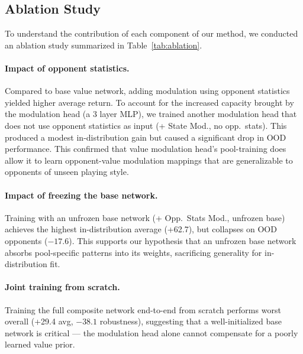 \documentclass{article}
\begin{document}

\subsection{Ablation Study}

To understand the contribution of each component of our method, we conducted an ablation study summarized in Table~\ref{tab:ablation}.

\paragraph{Impact of opponent statistics.}
Compared to base value network, adding modulation using opponent statistics yielded higher average return. To account for the increased capacity brought by the modulation head (a 3 layer MLP), we trained another modulation head that does not use opponent statistics as input (+ State Mod., no opp.\ stats). This produced a modest in-distribution gain but caused a significant drop in OOD performance. This confirmed that value modulation head's pool-training does allow it to learn opponent-value modulation mappings that are generalizable to opponents of unseen playing style.

\paragraph{Impact of freezing the base network.}
Training with an unfrozen base network (+ Opp.\ Stats Mod., unfrozen base) achieves the highest in-distribution average (+62.7), but collapses on OOD opponents ($-17.6$). This supports our hypothesis that an unfrozen base network absorbs pool-specific patterns into its weights, sacrificing generality for in-distribution fit.

\paragraph{Joint training from scratch.}
Training the full composite network end-to-end from scratch performs worst overall (+29.4 avg, $-38.1$ robustness), suggesting that a well-initialized base network is critical --- the modulation head alone cannot compensate for a poorly learned value prior.
\end{document}
